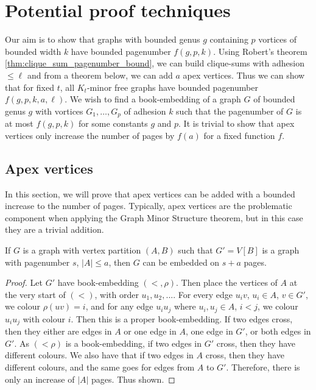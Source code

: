 
\chapter{Potential proof techniques}\label{chap:Proving_The_Theorem}
Our aim is to show that graphs with bounded genus \(g\) containing \(p\) vortices of bounded width \(k\) have bounded pagenumber \(f(g, p, k)\).
Using Robert's theorem \cref{thm:clique_sum_pagenumber_bound}, we can build clique-sums with adhesion \(\leq \ell\) and from a theorem below, we can add \(a\) apex vertices.
Thus we can show that for fixed \(t\), all \(K_t\)-minor free graphs have bounded pagenumber \(f(g, p, k, a, \ell)\).
We wish to find a book-embedding of a graph \(G\) of bounded genus \(g\) with vortices \(G_1, \ldots, G_p\) of adhesion \(k\) such that the pagenumber of \(G\) is at most \(f(g, p, k)\) for some constants \(g\) and \(p\). It is trivial to show that apex vertices only increase the number of pages by \(f(a)\) for a fixed function \(f\).
\section{Apex vertices}
In this section, we will prove that apex vertices can be added with a bounded increase to the number of pages. Typically, apex vertices are the problematic component when applying the Graph Minor Structure theorem, but in this case they are a trivial addition.
\begin{theorem}\label{thm:apex_vertices_pagenumber}
	If \(G\) is a graph with vertex partition \((A, B)\) such that \(G' = V[B]\) is a graph with pagenumber \(s\), \(|A| \leq a\), then \(G\) can be embedded on \(s + a \) pages.
\end{theorem}
\begin{proof}
	Let \(G'\) have book-embedding \((<, \rho)\). Then place the vertices of \(A\) at the very start of \((<)\), with order $u_1, u_2, ...$. For every edge \(u_i v \), \(u_i \in A\), \(v \in G'\), we colour \(\rho(uv) = i\), and for any edge \(u_i u_j\) where $u_i, u_j \in A$, $i < j$, we colour $u_i u_j$ with colour $i$. Then this is a proper book-embedding. If two edges cross, then they either are edges in $A$ or one edge in $A$, one edge in $G'$, or both edges in $G'$. As $(< \rho)$ is a book-embedding, if two edges in $G'$ cross, then they have different colours. We also have that if two edges in $A$ cross, then they have different colours, and the same goes for edges from $A$ to $G'$. Therefore, there is only an increase of $|A|$ pages. Thus shown.
\end{proof}

